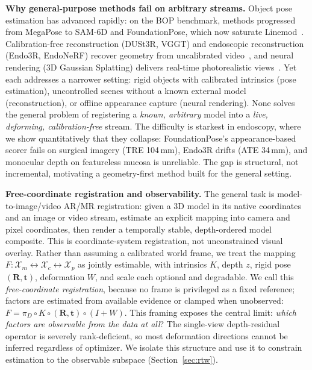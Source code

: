 \documentclass[9pt,twoside,web]{ieeecolor2}
\begin{document}
\textbf{Why general-purpose methods fail on arbitrary streams.} Object pose estimation has advanced rapidly: on the BOP benchmark, methods progressed from MegaPose to SAM-6D and FoundationPose, which now saturate Linemod~\cite{labbe2022megapose,lin2024sam6d,wen2024foundationpose}. Calibration-free reconstruction (DUSt3R, VGGT) and endoscopic reconstruction (Endo3R, EndoNeRF) recover geometry from uncalibrated video~\cite{wang2024dust3r,wang2025vggt,guo2025endo3r,wang2022endonerf}, and neural rendering (3D Gaussian Splatting) delivers real-time photorealistic views~\cite{kerbl20233dgs}. Yet each addresses a narrower setting: rigid objects with calibrated intrinsics (pose estimation), uncontrolled scenes without a known external model (reconstruction), or offline appearance capture (neural rendering). None solves the general problem of registering a \emph{known, arbitrary} model into a \emph{live, deforming, calibration-free} stream. The difficulty is starkest in endoscopy, where we show quantitatively that they collapse: FoundationPose's appearance-based scorer fails on surgical imagery (TRE 104\,mm), Endo3R drifts (ATE 34\,mm), and monocular depth on featureless mucosa is unreliable. The gap is structural, not incremental, motivating a geometry-first method built for the general setting.

\textbf{Free-coordinate registration and observability.} The general task is model-to-image/video AR/MR registration: given a 3D model in its native coordinates and an image or video stream, estimate an explicit mapping into camera and pixel coordinates, then render a temporally stable, depth-ordered model composite. This is coordinate-system registration, not unconstrained visual overlay. Rather than assuming a calibrated world frame, we treat the mapping $F:\mathcal{X}_{m}\leftrightarrow\mathcal{X}_{c}\leftrightarrow\mathcal{X}_{p}$ as jointly estimable, with intrinsics $K$, depth $z$, rigid pose $(\mathbf{R},\mathbf{t})$, deformation $W$, and scale each optional and degradable. We call this \emph{free-coordinate registration}, because no frame is privileged as a fixed reference; factors are estimated from available evidence or clamped when unobserved: $F=\pi_{D}\circ K\circ(\mathbf{R},\mathbf{t})\circ(I+W)$. This framing exposes the central limit: \emph{which factors are observable from the data at all}? The single-view depth-residual operator is severely rank-deficient, so most deformation directions cannot be inferred regardless of optimizer. We isolate this structure and use it to constrain estimation to the observable subspace (Section~\ref{sec:rtw}).
\end{document}
